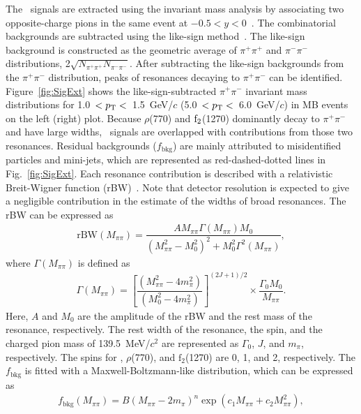 The \fzero~signals are extracted using the invariant mass analysis by associating two opposite-charge pions in the same event at $-0.5<y<0$~\cite{ALICE:2013wgn}. The combinatorial backgrounds are subtracted using the like-sign method~\cite{PhysRevD.36.2019}. The like-sign background is constructed as the geometric average of $\pi^{+}\pi^{+}$ and $\pi^{-}\pi^{-}$ distributions,  2$\sqrt{N_{\pi^{+}\pi^{+}}N_{\pi^{-}\pi^{-}}}$. After subtracting the like-sign backgrounds from the $\pi^{+}\pi^{-}$ distribution, peaks of resonances decaying to $\pi^{+}\pi^{-}$ can be identified. Figure~\ref{fig:SigExt} shows the like-sign-subtracted $\pi^{+}\pi^{-}$ invariant mass distributions for 1.0~$<p_{\rm{T}}<$~1.5~GeV/$c$ (5.0~$<p_{\rm{T}}<$~6.0~GeV/$c$) in MB events on the left (right) plot. Because $\rho$(770) and $\rm{f}_{2}$(1270) dominantly decay to $\pi^{+}\pi^{-}$ and have large widths, \fzero~signals are overlapped with contributions from those two resonances. Residual backgrounds ($f_{\mathrm{bkg}}$) are mainly attributed to misidentified particles and mini-jets, which are represented as red-dashed-dotted lines in Fig.~\ref{fig:SigExt}. Each resonance contribution is described with a relativistic Breit-Wigner function (rBW)~\cite{ALICE:2018qdv, ALICE:2022qnb}. Note that detector resolution is expected to give a negligible contribution in the estimate of the widths of broad resonances. The rBW can be expressed as
\begin{eqnarray}
\mathrm{rBW}(M_{\pi\pi}) = \dfrac{AM_{\pi\pi}\Gamma(M_{\pi\pi})M_{0}}{(M_{\pi\pi}^{2}-M_{0}^{2})^{2} + M_{0}^{2}\Gamma^{2}(M_{\pi\pi})},
\label{eq:rBW}
\end{eqnarray}
where $\Gamma(M_{\pi\pi})$ is defined as
\begin{eqnarray}
\Gamma(M_{\pi\pi}) = \left[ \dfrac{ (M_{\pi\pi}^{2} - 4m_{\pi}^{2}) }{ (M_{0}^{2}-4m_{\pi}^{2}) } \right]^{(2J+1)/2} \times \dfrac{\Gamma_{0}M_{0}}{M_{\pi\pi}} .
\label{eq:rBWW}
\end{eqnarray}
Here, $A$ and $M_{0}$ are the amplitude of the rBW and the rest mass of the resonance, respectively. The rest width of the resonance, the spin, and the charged pion mass of 139.5~MeV/$c^{2}$ are represented as $\Gamma_{0}$, $J$, and $m_{\pi}$, respectively. The spins for \fzero, $\rho$(770), and $\mathrm{f}_{2}$(1270) are 0, 1, and 2, respectively. The $f_{\mathrm{bkg}}$ is fitted with a Maxwell-Boltzmann-like distribution, which can be expressed as~\cite{OPAL:1998enc}
\begin{eqnarray}
f_{\mathrm{bkg}}(M_{\pi\pi}) = B(M_{\pi\pi}-2m_{\pi})^{n}\exp{(c_{1}M_{\pi\pi} + c_{2}M_{\pi\pi}^{2})},
\label{eq:bkg}
\end{eqnarray} 
